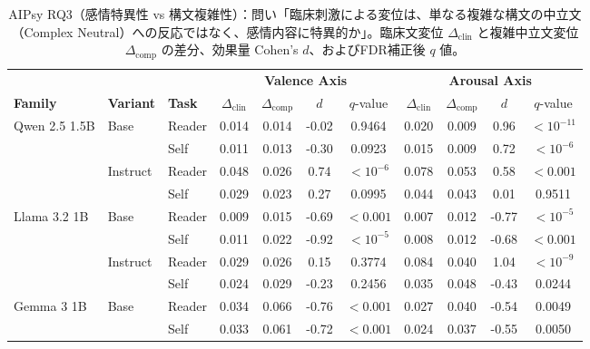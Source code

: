 \begin{table}[htbp]
\centering
\small
\caption{AIPsy RQ3（感情特異性 vs 構文複雑性）：問い「臨床刺激による変位は、単なる複雑な構文の中立文（Complex Neutral）への反応ではなく、感情内容に特異的か」。臨床文変位 $\Delta_{\text{clin}}$ と複雑中立文変位 $\Delta_{\text{comp}}$ の差分、効果量 Cohen's $d$、およびFDR補正後 $q$ 値。}
\label{tab:behavioral_aipsy_rq3_specificity}
\begin{tabular}{lll cccc cccc}
\toprule
 & & & \multicolumn{4}{c}{\textbf{Valence Axis}} & \multicolumn{4}{c}{\textbf{Arousal Axis}} \\
\cmidrule(lr){4-7} \cmidrule(lr){8-11}
\textbf{Family} & \textbf{Variant} & \textbf{Task} & $\Delta_{\text{clin}}$ & $\Delta_{\text{comp}}$ & $d$ & $q$-value & $\Delta_{\text{clin}}$ & $\Delta_{\text{comp}}$ & $d$ & $q$-value \\
\midrule
\multirow{4}{*}{Qwen 2.5 1.5B} & \multirow{2}{*}{Base} & Reader     & 0.014 & 0.014 & -0.02 & 0.9464 & 0.020 & 0.009 & 0.96 & $<10^{-11}$ \\
                       &                      & Self       & 0.011 & 0.013 & -0.30 & 0.0923 & 0.015 & 0.009 & 0.72 & $<10^{-6}$ \\
\cmidrule(lr){2-11}
                       & \multirow{2}{*}{Instruct} & Reader     & 0.048 & 0.026 & 0.74 & $<10^{-6}$ & 0.078 & 0.053 & 0.58 & $<0.001$ \\
                       &                      & Self       & 0.029 & 0.023 & 0.27 & 0.0995 & 0.044 & 0.043 & 0.01 & 0.9511 \\
\midrule
\multirow{4}{*}{Llama 3.2 1B} & \multirow{2}{*}{Base} & Reader     & 0.009 & 0.015 & -0.69 & $<0.001$ & 0.007 & 0.012 & -0.77 & $<10^{-5}$ \\
                       &                      & Self       & 0.011 & 0.022 & -0.92 & $<10^{-5}$ & 0.008 & 0.012 & -0.68 & $<0.001$ \\
\cmidrule(lr){2-11}
                       & \multirow{2}{*}{Instruct} & Reader     & 0.029 & 0.026 & 0.15 & 0.3774 & 0.084 & 0.040 & 1.04 & $<10^{-9}$ \\
                       &                      & Self       & 0.024 & 0.029 & -0.23 & 0.2456 & 0.035 & 0.048 & -0.43 & 0.0244 \\
\midrule
\multirow{4}{*}{Gemma 3 1B} & \multirow{2}{*}{Base} & Reader     & 0.034 & 0.066 & -0.76 & $<0.001$ & 0.027 & 0.040 & -0.54 & 0.0049 \\
                       &                      & Self       & 0.033 & 0.061 & -0.72 & $<0.001$ & 0.024 & 0.037 & -0.55 & 0.0050 \\

\end{tabular}
\end{table}
